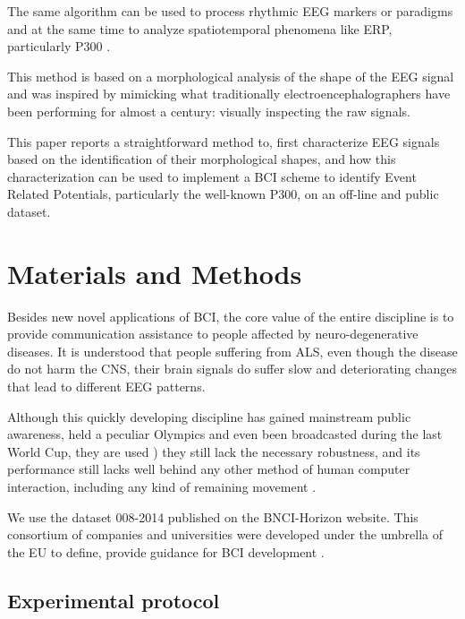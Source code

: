 \documentclass[entropy,article,submit,moreauthors,pdftex,10pt,a4paper]{mdpi}
\begin{document}
The same algorithm can be used to process rhythmic EEG markers or paradigms and at the same time to analyze spatiotemporal phenomena like ERP, particularly P300 \citep{Ramele2016}.

This method is based on a morphological analysis of the shape of the EEG signal and was inspired by mimicking what traditionally electroencephalographers have been performing for almost a century: visually inspecting the raw signals.


This paper reports a straightforward method to, first characterize EEG signals based on the identification of their morphological shapes, and how this characterization can be used to implement a BCI scheme to identify Event Related Potentials, particularly the well-known P300, on an off-line and public dataset.


\section{Materials and Methods}

Besides new novel applications of BCI, the core value of the entire discipline is to provide communication assistance to people affected by neuro-degenerative diseases.  It is understood that people suffering from ALS, even though the disease do not harm the CNS, their brain signals do suffer slow and deteriorating changes that lead to different EEG  patterns\citep{Riener2014}.

Although this quickly developing discipline has gained mainstream public awareness, held a peculiar Olympics \citep{Riener2014} and even been broadcasted during the last World Cup,  they are used \citep{Huggins2016}) they still lack the necessary robustness, and its performance still lacks well behind any other method of human computer interaction, including any kind of remaining movement \citep{Clerc}.

We use the dataset 008-2014 published on the BNCI-Horizon website.  This consortium of companies and universities were developed under the umbrella of the EU to define, provide guidance for BCI development \citep{Riccio2013}.

\subsection{Experimental protocol}
\end{document}
